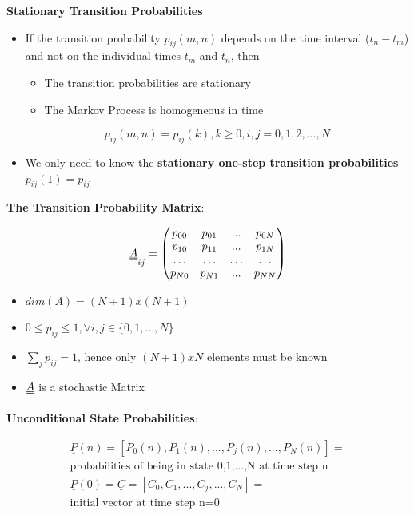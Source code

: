 \documentclass[8pt, landscape, fleqn]{scrartcl}
\begin{document}
\begin{multicols*}{3}
\textbf{Stationary Transition Probabilities}

\begin{itemize}
    \item If the transition probability $p_{ij}(m,n)$ depends on the time interval ($t_n-t_m$) and not on the individual times $t_m$ and $t_n$, then
    \begin{itemize}
        \item The transition probabilities are stationary 
        \item The Markov Process is homogeneous in time 
    \end{itemize} \begin{equation}
        p_{ij}(m,n) = p_{ij}(k), k\geq 0, i,j=0,1,2,...,N
    \end{equation}
    \item We only need to know the \textbf{stationary one-step transition probabilities} $p_{ij}(1) = p_{ij}$
\end{itemize}

\textbf{The Transition Probability Matrix}:

\begin{equation}
    \uuline{A}_{ij} = \begin{pmatrix}
        p_{00} & p_{01} & ... & p_{0N} \\
        p_{10} & p_{11} & ... & p_{1N} \\
        \dots   & \dots & \dots & \dots \\
        p_{N0} & p_{N1} & ... & p_{NN}
    \end{pmatrix}
\end{equation}

\begin{itemize}
    \item $dim(A) = (N+1) x (N+1)$
    \item $0 \leq p_{ij} \leq 1, \forall i, j \in \{0,1,...,N\}$
    \item $\sum_j p_{ij} = 1$, hence only $(N+1)xN$ elements must be known 
    \item $\uuline{A}$ is a stochastic Matrix 
\end{itemize}


\textbf{Unconditional State Probabilities}:

\begin{align}
    \underline{P}(n) = \left[ P_0(n), P_1(n), ..., P_j(n),...,P_N(n)\right] = \\ \text{probabilities of being in state 0,1,...,N at time step n} \\
    \underline{P}(0) = \underline{C} = \left[C_0, C_1, ..., C_j,..., C_N\right] = \\ \text{initial vector at time step n=0}
\end{align}


\end{multicols*}
\end{document}
